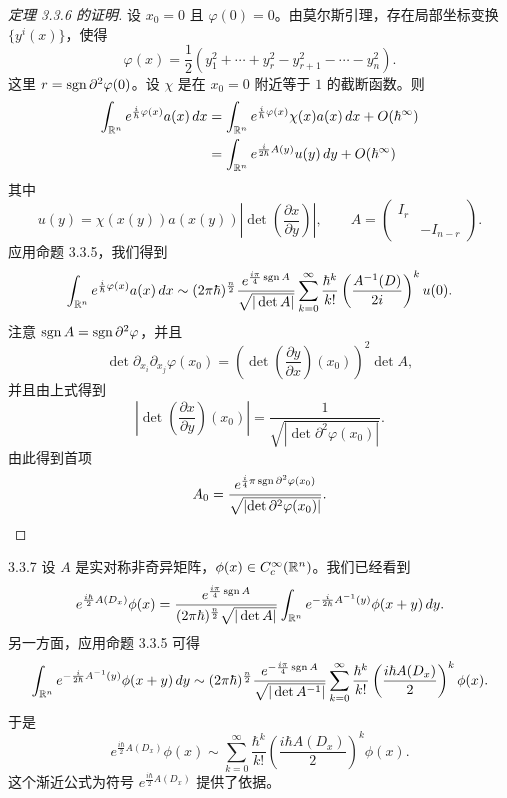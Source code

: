 

\begin{proof}[定理 3.3.6 的证明]
设 \(x_0=0\) 且 \(\varphi(0)=0\)。由莫尔斯引理，存在局部坐标变换 \(\{y^i(x)\}\)，使得
\[
  \varphi(x)=\frac{1}{2}\left(y_1^2+\cdots+y_r^2-y_{r+1}^2-\cdots-y_n^2\right).
\]
这里 \(r=\operatorname{sgn}\partial^2\varphi(0)\)。设 \(\chi\) 是在 \(x_0=0\) 附近等于 \(1\) 的截断函数。则
\begin{align*}
  \int_{\mathbb{R}^n}e^{\frac{i}{\hbar}\varphi(x)}a(x)\,dx
  &=\int_{\mathbb{R}^n}e^{\frac{i}{\hbar}\varphi(x)}\chi(x)a(x)\,dx+O(\hbar^\infty)\\
  &=\int_{\mathbb{R}^n}e^{\frac{i}{2\hbar}A(y)}u(y)\,dy+O(\hbar^\infty)
\end{align*}
其中
\[
  u(y)=\chi(x(y))a(x(y))\left|\det\left(\frac{\partial x}{\partial y}\right)\right|,
  \qquad
  A=\begin{pmatrix}I_r&\\ &-I_{n-r}\end{pmatrix}.
\]
应用命题 3.3.5，我们得到
\[
  \int_{\mathbb{R}^n}e^{\frac{i}{\hbar}\varphi(x)}a(x)\,dx
  \sim (2\pi\hbar)^{\frac{n}{2}}\frac{e^{\frac{i\pi}{4}\operatorname{sgn} A}}{\sqrt{|\det A|}}
  \sum_{k=0}^{\infty}\frac{\hbar^k}{k!}\left(\frac{A^{-1}(D)}{2i}\right)^k u(0).
\]
注意 \(\operatorname{sgn} A=\operatorname{sgn}\partial^2\varphi\)，并且
\[
  \det\partial_{x_i}\partial_{x_j}\varphi(x_0)
  =\left(\det\left(\frac{\partial y}{\partial x}\right)(x_0)\right)^2\det A,
\]
并且由上式得到
\[
  \left|\det\left(\frac{\partial x}{\partial y}\right)(x_0)\right|
  =\frac{1}{\sqrt{\left|\det\partial^2\varphi(x_0)\right|}}.
\]
由此得到首项
\[
  A_0=\frac{e^{\frac{i}{4}\pi\operatorname{sgn}\partial^2\varphi(x_0)}}{\sqrt{\left|\det\partial^2\varphi(x_0)\right|}}.
\]
\end{proof}

\begin{example}{3.3.7}
设 \(A\) 是实对称非奇异矩阵，\(\phi(x)\in C_c^\infty(\mathbb{R}^n)\)。我们已经看到
\[
  e^{\frac{i\hbar}{2}A(D_x)}\phi(x)
  =\frac{e^{\frac{i\pi}{4}\operatorname{sgn} A}}{(2\pi\hbar)^{\frac{n}{2}}\sqrt{|\det A|}}
  \int_{\mathbb{R}^n}e^{-\frac{i}{2\hbar}A^{-1}(y)}\phi(x+y)\,dy.
\]
另一方面，应用命题 3.3.5 可得
\[
  \int_{\mathbb{R}^n}e^{-\frac{i}{2\hbar}A^{-1}(y)}\phi(x+y)\,dy
  \sim (2\pi\hbar)^{\frac{n}{2}}\frac{e^{-\frac{i\pi}{4}\operatorname{sgn} A}}{\sqrt{|\det A^{-1}|}}
  \sum_{k=0}^{\infty}\frac{\hbar^k}{k!}\left(\frac{i\hbar A(D_x)}{2}\right)^k\phi(x).
\]
于是
\[
  e^{\frac{i\hbar}{2}A(D_x)}\phi(x)
  \sim\sum_{k=0}^{\infty}\frac{\hbar^k}{k!}\left(\frac{i\hbar A(D_x)}{2}\right)^k\phi(x).
\]
这个渐近公式为符号 \(e^{\frac{i\hbar}{2}A(D_x)}\) 提供了依据。
\end{example}

